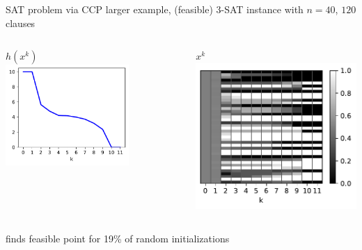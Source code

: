 \documentclass[aspectratio=169,11pt]{beamer}
\begin{document}
\begin{frame}[fragile]{SAT problem via CCP}
larger example, (feasible) 3-SAT instance with $n=40$, $120$ clauses
\vfill
\begin{columns}
\begin{column}{0.6\textwidth}
\centering
$h(x^k)$ \\
\includegraphics[width=0.7\textwidth]{sat_large_value.pdf}
\end{column}
\begin{column}{0.4\textwidth}
\hspace{60pt} $x^k$\\
\includegraphics[width=\textwidth]{sat_large.pdf}
\end{column}
\end{columns}

finds feasible point for 19\% of random initializations
\end{frame}
\end{document}
